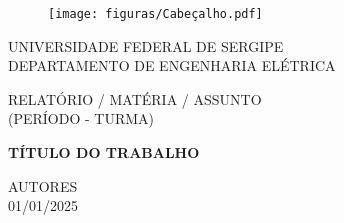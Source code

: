 \begin{figure}[t]
    \centering
    \texttt{[image: figuras/Cabeçalho.pdf]}
    \label{fig:cabecalho}
\end{figure}




\begin{center}
 
 \Large UNIVERSIDADE FEDERAL DE SERGIPE\\
 DEPARTAMENTO DE ENGENHARIA ELÉTRICA\\
\vspace{10mm} 

\large RELATÓRIO / MATÉRIA / ASSUNTO\\
 (PERÍODO - TURMA) \\

\vspace{25mm}

\textbf{\Large TÍTULO DO TRABALHO}

\vspace{25mm}
\vspace{40mm}
{\large 
AUTORES
\\
01/01/2025
\vspace{0mm}

}\end{center}